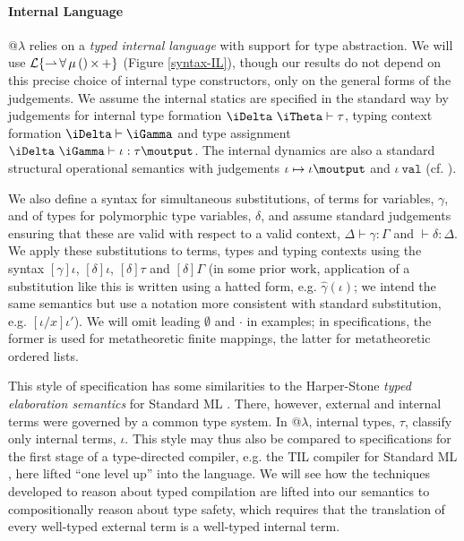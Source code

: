 \paragraph{Internal Language} @$\lambda$ relies on a \emph{typed internal language} with support for type abstraction. We will use {$\mathcal{L}\{{\rightharpoonup}\,{\forall}\,{\mu}\,{()}\,{\times}\,{+}\}$} (Figure \ref{syntax-IL}), though our results do not depend on this precise choice of internal type constructors, only on the general forms of the judgements. We assume the internal statics are specified in the standard way by judgements for internal type formation {$\iDelta~\iTheta \vdash \tau$}, typing context formation { $\iDelta \vdash \iGamma$} and type assignment {$\iDelta~\iGamma \vdash \iota : \tau\moutput$}. The internal dynamics are also a standard structural operational semantics with judgements {\small $\iota \mapsto \iota\moutput$} and {$\iota~\mathtt{val}$} (cf. \cite{pfpl}). 

We also define a syntax for simultaneous substitutions, of terms for variables, $\gamma$, and of types for polymorphic type variables, $\delta$, and assume standard judgements ensuring that these are valid with respect to a valid context, $\Delta \vdash \gamma : \Gamma$ and $\vdash \delta : \Delta$. We apply these substitutions to terms, types and typing contexts using the syntax $[\gamma]\iota$, $[\delta]\iota$, $[\delta]\tau$ and $[\delta]\Gamma$ (in some prior work, application of a substitution like this is written using a hatted form, e.g. $\hat\gamma(\iota)$; we intend the same semantics but use a notation more consistent with standard substitution, e.g. $[\iota/x]\iota'$). We will omit  leading $\emptyset$ and $\cdot$ in examples; in specifications, the former is used for  metatheoretic finite mappings, the latter for metatheoretic ordered lists.

This style of specification has some  similarities to the Harper-Stone \emph{typed elaboration semantics} for Standard ML \cite{Harper00atype-theoretic}. There, however, external and internal terms were governed by a common type system. In @$\lambda$, {internal types}, $\tau$, classify only internal terms, $\iota$. 
This style may thus also be compared to specifications for the first stage of a type-directed compiler, e.g. the TIL compiler for Standard ML \cite{tarditi+:til-OLD}, here lifted ``one level up'' into the language. We will see how the techniques developed to reason about typed compilation are lifted into our semantics to compositionally reason about type safety, which requires that the translation of every well-typed external term is a well-typed internal term.


